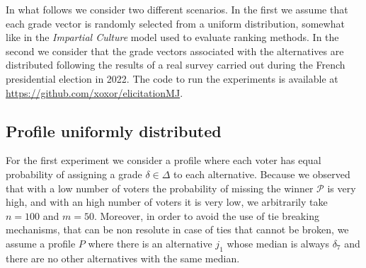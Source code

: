 	In what follows we consider two different scenarios. In the first we assume that each grade vector is randomly selected from a uniform distribution, somewhat like in the \textit{Impartial Culture} model used to evaluate ranking methods. In the second we consider that the grade vectors associated with the alternatives are distributed following the results of a real survey carried out during the French presidential election in 2022. The code to run the experiments is available at \url{	https://github.com/xoxor/elicitationMJ}.

	\subsection{Profile uniformly distributed}
	For the first experiment we consider a profile where each voter has equal probability of assigning a grade $\delta \in \Delta$ to each alternative. Because we observed that with a low number of voters the probability of missing the winner $\mathcal{P}$ is very high, and with an high number of voters it is very low, we arbitrarily take $n=100$ and $m=50$. Moreover, in order to avoid the use of tie breaking mechanisms, that can be non resolute in case of ties that cannot be broken, we assume a profile $P$ where there is an alternative $j_1$ whose median is always $\delta_7$ and there are no other alternatives with the same median. 
